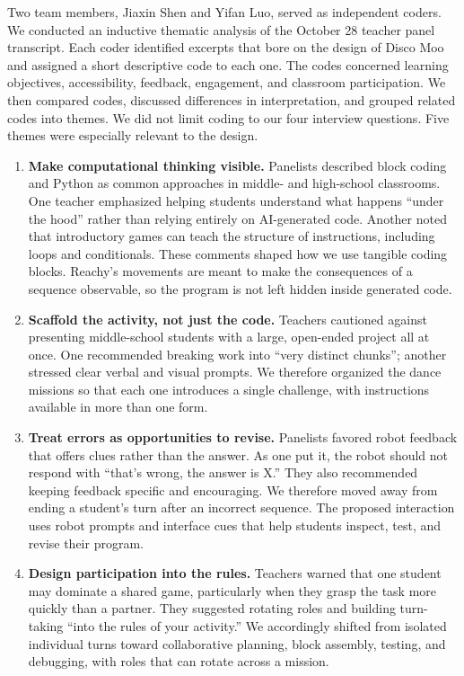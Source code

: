 \documentclass[conference]{IEEEtran}
\begin{document}
Two team members, Jiaxin Shen and Yifan Luo, served as independent coders. We conducted an inductive thematic analysis of the October 28 teacher panel transcript. Each coder identified excerpts that bore on the design of Disco Moo and assigned a short descriptive code to each one. The codes concerned learning objectives, accessibility, feedback, engagement, and classroom participation. We then compared codes, discussed differences in interpretation, and grouped related codes into themes. We did not limit coding to our four interview questions. Five themes were especially relevant to the design.

\begin{enumerate}
    \item \textbf{Make computational thinking visible.} Panelists described block coding and Python as common approaches in middle- and high-school classrooms. One teacher emphasized helping students understand what happens ``under the hood'' rather than relying entirely on AI-generated code. Another noted that introductory games can teach the structure of instructions, including loops and conditionals. These comments shaped how we use tangible coding blocks. Reachy's movements are meant to make the consequences of a sequence observable, so the program is not left hidden inside generated code.

    \item \textbf{Scaffold the activity, not just the code.} Teachers cautioned against presenting middle-school students with a large, open-ended project all at once. One recommended breaking work into ``very distinct chunks''; another stressed clear verbal and visual prompts. We therefore organized the dance missions so that each one introduces a single challenge, with instructions available in more than one form.

    \item \textbf{Treat errors as opportunities to revise.} Panelists favored robot feedback that offers clues rather than the answer. As one put it, the robot should not respond with ``that's wrong, the answer is X.'' They also recommended keeping feedback specific and encouraging. We therefore moved away from ending a student's turn after an incorrect sequence. The proposed interaction uses robot prompts and interface cues that help students inspect, test, and revise their program.

    \item \textbf{Design participation into the rules.} Teachers warned that one student may dominate a shared game, particularly when they grasp the task more quickly than a partner. They suggested rotating roles and building turn-taking ``into the rules of your activity.'' We accordingly shifted from isolated individual turns toward collaborative planning, block assembly, testing, and debugging, with roles that can rotate across a mission.


\end{enumerate}
\end{document}
